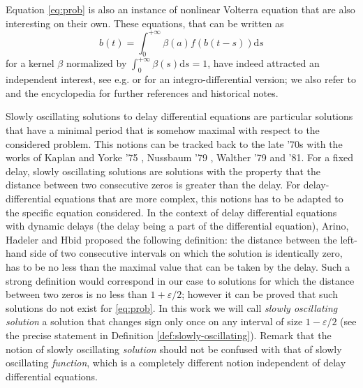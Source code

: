 \documentclass[a4paper,11pt]{article}
\theoremstyle{plain}
\theoremstyle{definition}
\theoremstyle{definition}
\newcommand{\dd}{\mathrm{d}}
\numberwithin{equation}{section}
\begin{document}
Equation \eqref{eq:prob} is also an instance of nonlinear Volterra equation that are also interesting on their own. These equations, that can be written as  
\begin{equation}\label{eq:Volterra}
    b(t) = \int_0^{+\infty} \beta(a) f(b(t-s)) \dd s
\end{equation}
for a kernel $\beta$ normalized by $\int_0^{+\infty} \beta(s)\dd s=1$, have indeed attracted an independent interest, see e.g. \cite{asselah,Diekmann,CDM,DiekmannGils,Nussbaum} or \cite{N1979} for an integro-differential version; we also refer to \cite{MalletNussbaum, Magal-Ruan-2018} and the encyclopedia \cite{GripenbergLonden} for further references and historical notes.
\medskip

Slowly oscillating solutions to delay differential equations are particular solutions that have a minimal period that is somehow maximal with respect to the considered problem. This notions can be tracked back to the late '70s with the works of Kaplan and Yorke '75 \cite{Kaplan-Yorke-1975}, Nussbaum '79 \cite{Nussbaum-1979}, Walther '79 and '81\cite{Walther-1981}. For a fixed delay, slowly oscillating solutions are solutions with the property that the distance between two consecutive zeros is greater than the delay. 
For delay-differential equations that are more complex, this notions has to be adapted to the specific equation considered. In the context of delay differential equations with dynamic delays (the delay being a part of the differential equation), Arino, Hadeler and Hbid \cite{Arino} proposed the following definition: the distance between the left-hand side of two consecutive intervals on which the solution is identically zero, has to be no less than the maximal value that can be taken by the delay.  Such a strong definition would correspond in our case to solutions for which the distance between two zeros is no less than $1+\varepsilon/2$; however it can be proved that such solutions do not exist for \eqref{eq:prob}.
In this work we will call \textit{slowly oscillating solution} a solution that changes sign only once on any interval of size $1-\varepsilon/2$ (see the precise statement in Definition \ref{def:slowly-oscillating}).
Remark that the notion of slowly oscillating \textit{solution} should not be confused with that of slowly oscillating \textit{function}, which is a completely different notion independent of delay differential equations.
\end{document}
